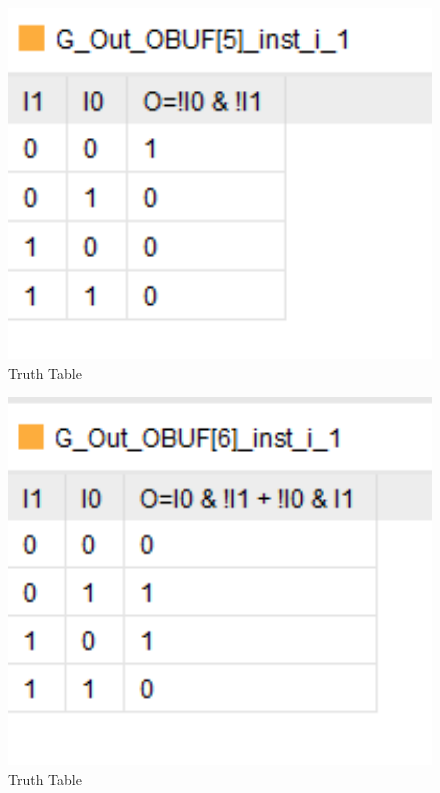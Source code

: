 \documentclass{article}
\begin{document}
\begin{figure}[h]
\begin{center}
\includegraphics[width=1\textwidth]{GatesTruthTableCont3.png} %
\caption{Truth Table}
\end{center}
\end{figure}

\begin{figure}[h]
\begin{center}
\includegraphics[width=1\textwidth]{GatesTruthTableCont4.png} %
\caption{Truth Table}
\end{center}
\end{figure}
\end{document}
